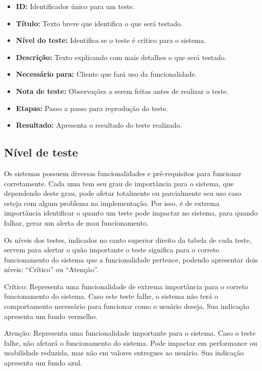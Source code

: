 \documentclass[
	12pt,				%
	oneside,			%
	a4paper,			%
	brazil				%
]{abntex2}
\begin{document}
{\begin{apendicesenv}
\begin{table}[H]
\end{table}
\egroup

\begin{itemize}

\item \textbf{ID:} Identificador único para um teste.
\item \textbf{Título: }Texto breve que identifica o que será testado.
\item \textbf{Nível do teste:} Identifica se o teste é crítico para o sistema.
\item \textbf{Descrição:} Texto explicando com mais detalhes o que será testado.
\item \textbf{Necessário para:} Cliente que fará uso da funcionalidade.
\item \textbf{Nota de teste:} Observações a serem feitas antes de realizar o teste.
\item \textbf{Etapas:} Passo a passo para reprodução do teste.
\item \textbf{Resultado:} Apresenta o resultado do teste realizado.

\end{itemize}

\newpage

\subsection*{Nível de teste}

Os sistemas possuem diversas funcionalidades e pré-requisitos para funcionar corretamente. Cada uma tem seu grau de importância para o sistema, que dependendo deste grau, pode afetar totalmente ou parcialmente seu uso caso esteja com algum problema na implementação. Por isso, é de extrema importância identificar o quanto um teste pode impactar no sistema, para quando falhar, gerar um alerta de mau funcionamento.

Os níveis dos testes, indicados no canto superior direito da tabela de cada teste, servem para alertar o quão importante o teste significa para o correto funcionamento do sistema que a funcionalidade pertence, podendo apresentar dois níveis: “Crítico” ou “Atenção”.

Crítico: Representa uma funcionalidade de extrema importância para o correto funcionamento do sistema. Caso este teste falhe, o sistema não terá o comportamento necessário para funcionar como o usuário deseja. Sua indicação apresenta um fundo vermelho. 

Atenção: Representa uma funcionalidade importante para o sistema. Caso o teste falhe, não afetará o funcionamento do sistema. Pode impactar em performance ou usabilidade reduzida, mas não em valores entregues ao usuário. Sua indicação apresenta um fundo azul.


\end{apendicesenv}}
\end{document}
